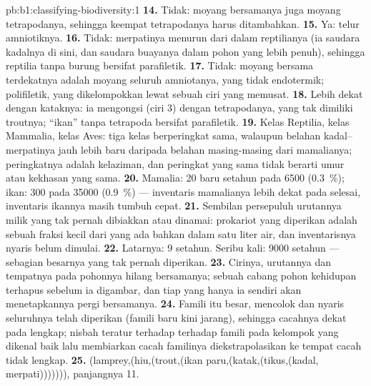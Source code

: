 \begin{solution}{pb:b1:classifying-biodiversity:1}
\textbf{14.} Tidak: moyang bersamanya juga moyang tetrapodanya,
sehingga keempat tetrapodanya harus ditambahkan.
\textbf{15.} Ya: telur amniotiknya.
\textbf{16.} Tidak: merpatinya menurun dari dalam reptilianya (ia
saudara kadalnya di sini, dan saudara buayanya dalam pohon yang lebih
penuh), sehingga reptilia tanpa burung bersifat parafiletik.
\textbf{17.} Tidak: moyang bersama terdekatnya adalah moyang seluruh
amniotanya, yang tidak endotermik; polifiletik, yang dikelompokkan
lewat sebuah ciri yang memusat.
\textbf{18.} Lebih dekat dengan kataknya: ia mengongsi  (ciri
3) dengan tetrapodanya, yang tak dimiliki troutnya; ``ikan'' tanpa
tetrapoda bersifat parafiletik.
\textbf{19.} Kelas Reptilia, kelas Mammalia, kelas Aves: tiga kelas
berperingkat sama, walaupun belahan kadal--merpatinya jauh lebih baru
daripada belahan masing-masing dari mamalianya; peringkatnya adalah
kelaziman, dan peringkat yang sama tidak berarti umur atau kekhasan
yang sama.
\textbf{20.} Mamalia: \num{20} baru setahun pada \num{6500}
(\qty{0.3}{\%}); ikan: \num{300} pada \num{35000} (\qty{0.9}{\%}) ---
inventaris mamalianya lebih dekat pada selesai, inventaris ikannya
masih tumbuh cepat.
\textbf{21.} Sembilan persepuluh urutannya milik  yang tak
pernah dibiakkan atau dinamai: prokariot yang diperikan adalah sebuah
fraksi kecil dari yang ada bahkan dalam satu liter air, dan
inventarisnya nyaris belum dimulai.
\textbf{22.} Latarnya: \num{9} setahun. Seribu kali: \num{9000}
setahun --- sebagian besarnya  yang tak pernah diperikan.
\textbf{23.} Cirinya, urutannya dan tempatnya pada pohonnya hilang
bersamanya; sebuah cabang pohon kehidupan terhapus sebelum ia
digambar, dan tiap  yang hanya ia sendiri akan menetapkannya
pergi bersamanya.
\textbf{24.} Famili itu besar, mencolok dan nyaris seluruhnya telah
diperikan (famili baru kini jarang), sehingga cacahnya dekat pada
lengkap; nisbah teratur  terhadap  terhadap famili pada
kelompok yang dikenal baik lalu membiarkan cacah familinya
diekstrapolasikan ke  tempat cacah  tidak lengkap.
\textbf{25.} (lamprey,(hiu,(trout,(ikan paru,(katak,(tikus,(kadal,
merpati))))))), panjangnya \num{11}.
\end{solution}

